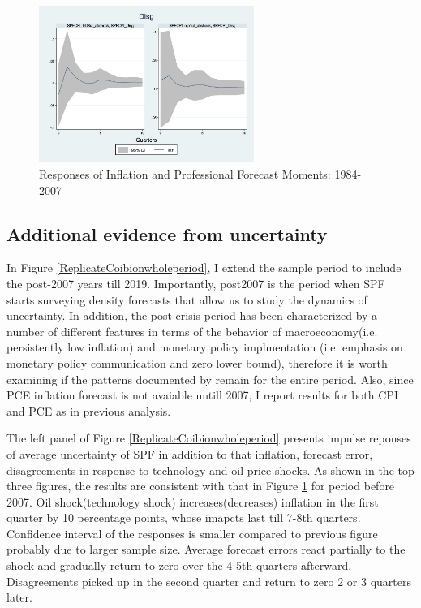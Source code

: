 \documentclass[]{article}
\begin{document}
\begin{figure}[ht]
		\includegraphics[width=7cm,totalheight=3cm]{figures/SPFDisg_ab_ashocks_before2007.png} 
	\caption{Responses of Inflation and Professional Forecast Moments: 1984-2007}
	\label{ReplicateCoibionBefore2007}
\end{figure}


\subsection{Additional evidence from uncertainty}

In Figure \ref{ReplicateCoibionwholeperiod}, I extend the sample period to include the post-2007 years till 2019. Importantly, post2007 is the period when SPF starts surveying density forecasts that allow us to study the dynamics of uncertainty. In addition, the post crisis period has been characterized by a number of different features in terms of the behavior of macroeconomy(i.e. persistently low inflation) and monetary policy implmentation (i.e. emphasis on monetary policy communication and zero lower bound), therefore it is worth examining if the patterns documented by \cite{coibion2012can} remain for the entire period. Also, since PCE inflation forecast is not avaiable untill 2007, I report results for both CPI and PCE as in previous analysis. 

The left panel of  Figure \ref{ReplicateCoibionwholeperiod} presents impulse reponses of average uncertainty of SPF in addition to that inflation, forecast error, disagreements in response to technology and oil price shocks. As shown in the top three figures, the results are consistent with that in Figure \ref{ReplicateCoibionBefore2007} for period before 2007.  Oil shock(technology shock) increases(decreases) inflation in the first quarter by 10 percentage  points, whose imapcts last till 7-8th quarters. Confidence interval of the responses is smaller compared to previous figure probably due to larger sample size.  Average forecast errors react partially to the shock and gradually return to zero over the 4-5th quarters afterward. Disagreements picked up in the second quarter and return to zero 2 or 3 quarters  later. 
\end{document}
